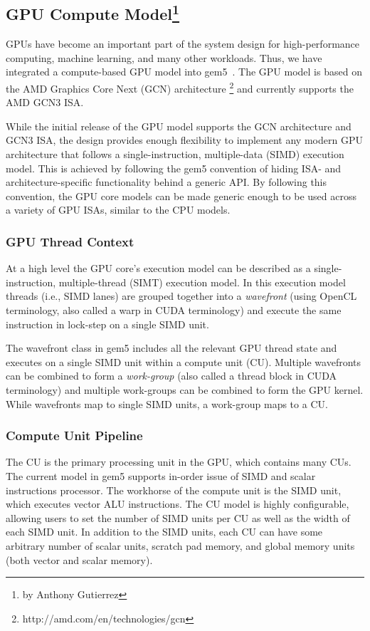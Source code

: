 \subsection[GPU Compute Model]{GPU Compute Model\footnote{by Anthony Gutierrez}}
\label{sec:gpu}

GPUs have become an important part of the system design for high-performance
computing, machine learning, and many other workloads. Thus, we have integrated
a compute-based GPU model into gem5~\cite{GutierrezBeckmann2018-amdAPU}. The
GPU model is based on the AMD Graphics Core Next (GCN) architecture
\footnote{http://amd.com/en/technologies/gcn} and currently
supports the AMD GCN3 ISA.

While the initial release of the GPU model supports the GCN architecture and
GCN3 ISA, the design provides enough flexibility to implement any
modern GPU architecture that follows a single-instruction, multiple-data
(SIMD) execution model. This is achieved by following the gem5
convention of hiding ISA- and architecture-specific functionality behind a
generic API. By following this convention, the GPU core models
can be made generic enough to be used across a variety of GPU ISAs, similar
to the CPU models.

\subsubsection[GPU Thread Context]{GPU Thread Context}
At a high level the GPU core's execution model can be described as a
single-instruction, multiple-thread (SIMT) execution model. In
this execution model threads (i.e., SIMD lanes) are grouped together into
a \textit{wavefront}
(using OpenCL terminology, also called a warp in CUDA terminology) and execute the
same instruction in lock-step on a single SIMD unit.

The wavefront class in gem5 includes all the relevant GPU thread state and
executes on a single SIMD unit within a compute unit (CU). Multiple wavefronts
can be combined to form a \textit{work-group} (also called
a thread block in CUDA terminology) and multiple work-groups can be combined to
form the GPU kernel. While wavefronts map to single SIMD units, a work-group maps
to a CU.

\subsubsection[Compute Unit Pipeline]{Compute Unit Pipeline}
The CU is the primary processing unit in the GPU, which contains many
CUs. The current model in gem5 supports in-order issue of SIMD and scalar
instructions processor.
The workhorse of the compute unit is the SIMD unit, which executes vector
ALU instructions. The CU model is highly configurable, allowing users to set the
number of SIMD units per CU as well as the width of each SIMD unit. In addition to
the SIMD units, each CU can have some arbitrary number of scalar units, scratch
pad memory, and global memory units (both vector and scalar memory).

